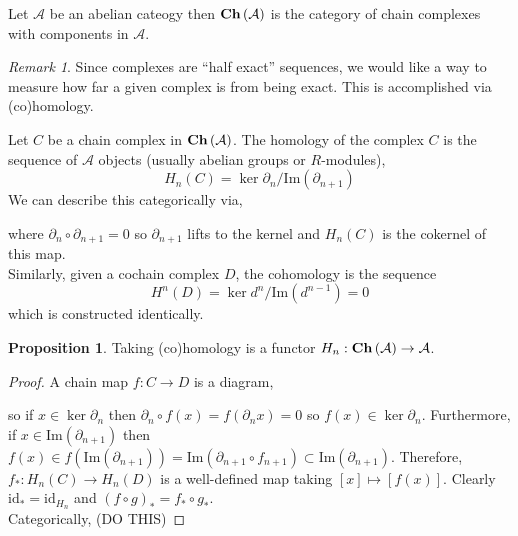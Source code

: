 \documentclass[12pt]{article}
\renewcommand{\Im}[1]{\mathrm{Im}(#1)}
\newcommand{\id}{\mathrm{id}}
\theoremstyle{remark}
\newtheorem*{remark}{Remark}
\theoremstyle{definition}
\newtheorem{proposition}[theorem]{Proposition}
\newenvironment{definition}[1][Definition:]{\begin{trivlist}
\item[\hskip \labelsep {\bfseries #1}]}{\end{trivlist}}
\begin{document}
\newcommand{\A}{\mathcal{A}}

\begin{definition}
Let $\A$ be an abelian cateogy then $\Ch{\A}$ is the category of chain complexes with components in $\A$. 
\end{definition}

\begin{remark}
Since complexes are ``half exact'' sequences, we would like a way to measure how far a given complex is from being exact. This is accomplished via (co)homology. 
\end{remark}

\begin{definition}
Let $C$ be a chain complex in $\Ch{\A}$. The homology of the complex $C$ is the sequence of $\A$ objects (usually abelian groups or $R$-modules),
\[ H_n(C) = \ker{\partial_n} / \Im{\partial_{n+1}} \]
We can describe this categorically via,
\begin{center}
\end{center}
where $\partial_{n} \circ \partial_{n+1} = 0$ so $\partial_{n+1}$ lifts to the kernel and $H_n(C)$ is the cokernel of this map. 
\bigskip\\
Similarly, given a cochain complex $D$, the cohomology is the sequence 
\[ H^n(D) = \ker{d^{n}} / \Im{d^{n-1}} = 0 \] 
which is constructed identically.
\end{definition}

\begin{proposition}
Taking (co)homology is a functor $H_n : \Ch{\A} \to \A$.
\end{proposition}

\begin{proof}
A chain map $f : C \to D$ is a diagram,
\begin{center}
\end{center}
so if $x \in \ker{\partial_n}$ then $\partial_n \circ f(x) = f(\partial_n x) = 0$ so $f(x) \in \ker{\partial_n}$. Furthermore, if $x \in \Im{\partial_{n+1}}$ then $f(x) \in f(\Im{\partial_{n+1}}) = \Im{\partial_{n+1} \circ f_{n+1}} \subset \Im{\partial_{n+1}}$. Therefore, $f_* : H_n(C) \to H_n(D)$ is a well-defined map taking $[x] \mapsto [f(x)]$. Clearly $\id_* = \id_{H_n}$ and $(f \circ g)_* = f_* \circ g_*$.
\bigskip\\
Categorically,   
(DO THIS)
\end{proof}
\end{document}
